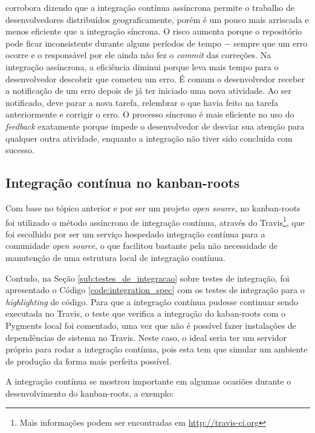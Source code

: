  corrobora dizendo que a integração contínua assíncrona permite o trabalho de desenvolvedores distribuídos geograficamente, porém é um pouco mais arriscada e menos eficiente que a integração síncrona. O risco aumenta porque o repositório pode ficar inconsistente durante alguns períodos de tempo $-$ sempre que um erro ocorre e o responsável por ele ainda não fez o \textit{commit} das correções. Na integração assíncrona, a eficiência diminui porque leva mais tempo para o desenvolvedor descobrir que cometeu um erro. É comum o desenvolvedor receber a notificação de um erro depois de já ter iniciado uma nova atividade. Ao ser notificado, deve parar a nova tarefa, relembrar o que havia feito na tarefa anteriormente e corrigir o erro. O processo síncrono é mais eficiente no uso do \textit{feedback} exatamente porque impede o desenvolvedor de desviar sua atenção para qualquer outra atividade, enquanto a integração não tiver sido concluída com sucesso.


\subsection{Integração contínua no kanban-roots}
\label{sub:integracao_continua_no_kanban}

Com base no tópico anterior e por ser um projeto \textit{open source}, no kanban-roots foi utilizado o método assíncrono de integração contínua, através do Travis\footnote{Mais informações podem ser encontradas em \url{http://travis-ci.org}}, que foi escolhido por ser um serviço hospedado integração contínua para a comunidade \textit{open source}, o que facilitou bastante pela não necessidade de manutenção de uma estrutura local de integração contínua.

Contudo, na Seção \ref{sub:testes_de_integracao} sobre testes de integração, foi apresentado o Código \ref{code:integration_spec} com os testes de integração para o \textit{highlighting} de código. Para que a integração contínua pudesse continuar sendo executada no Travis, o teste que verifica a integração do kaban-roots com o Pygments local foi comentado, uma vez que não é possível fazer instalações de dependências de sistema no Travis. Neste caso, o ideal seria ter um servidor próprio para rodar a integração contínua, pois esta tem que simular um ambiente de produção da forma mais perfeita possível.

A integração contínua se mostrou importante em algumas ocasiões durante o desenvolvimento do kanban-roots, a exemplo:

